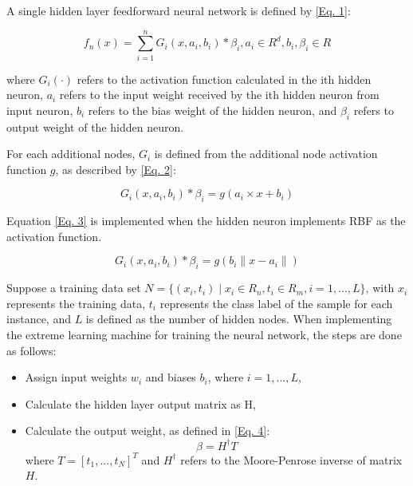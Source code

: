 \documentclass[journal,comsoc]{IEEEtran}
\begin{document}
A single hidden layer feedforward neural network is defined by \eqref{Eq. 1}:

\begin{equation}
f_{n} (x) = \sum_{i=1}^{n} G_{i} (x, a_{i}, b_{i}) * \beta_{i}, a_{i} \in R^d, b_{i}, \beta_{i} \in R\label{Eq. 1}
\end{equation}

where $G_{i}(\cdot)$ refers to the activation function calculated in the ith hidden neuron, $a_{i}$ refers to the input weight received by the ith hidden neuron from input neuron, $b_{i}$ refers to the bias weight of the hidden neuron, and $\beta_{i}$ refers to output weight of the hidden neuron.

For each additional nodes, $G_{i}$ is defined from the additional node activation function $g$, as described by \eqref{Eq. 2}:

\begin{equation}
G_{i} (x, a_{i}, b_{i}) * \beta_{i} = g(a_{i} \times x + b_{i})\label{Eq. 2}
\end{equation}

Equation \eqref{Eq. 3} is implemented when the hidden neuron implements RBF as the activation function.

\begin{equation}
G_{i}(x, a_{i}, b_{i}) * \beta_{i} = g(b_{i}\parallel x - a_{i} \parallel)\label{Eq. 3}
\end{equation}

Suppose a training data set $ N = \{(x_{i},t_{i}) \mid x_{i} \in R_{n}, t_{i} \in R_{m}, i = 1, ..., L\}$, with $x_{i}$ represents the training data, $t_{i}$ represents the class label of the sample for each instance, and $L$ is defined as the number of hidden nodes. When implementing the extreme learning machine for training the neural network, the steps are done as follows:

\begin{itemize}
\item Assign input weights $w_{i}$ and biases $b_{i}$, where $i = 1, ..., L$,
\item Calculate the hidden layer output matrix as H,
\item Calculate the output weight, as defined in \eqref{Eq. 4}:
\begin{equation}
\beta = H^\dagger T\label{Eq. 4}
\end{equation}
where $T = [t_{1},...,t_{N}]^T$ and $H^\dagger$ refers to the Moore-Penrose inverse of matrix $H$.
\end{itemize}
\end{document}
